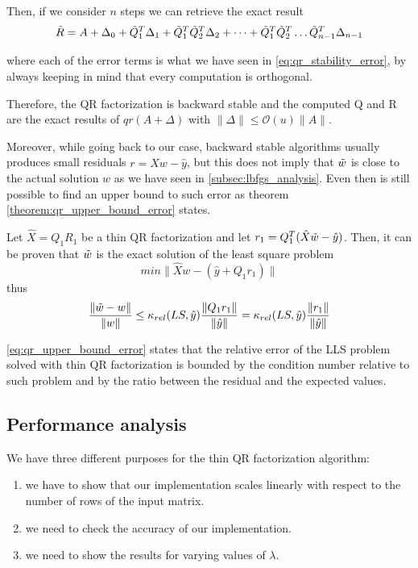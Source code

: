 \noindent Then, if we consider $n$ steps we can retrieve the exact result
\begin{equation}
    \Tilde{R} = A+\Delta_0+\Tilde{Q}_1^T\Delta_1+\Tilde{Q}_1^T\Tilde{Q}_2^T\Delta_2+\dots+\Tilde{Q}_1^T\Tilde{Q}_2^T\dots\Tilde{Q}_{n-1}^T\Delta_{n-1}
    \label{eq:qr_stability_exact_result}
\end{equation}

\noindent where each of the error terms is what we have seen in \eqref{eq:qr_stability_error}, by always keeping in mind that every computation is orthogonal.
\vspace{3mm}

\noindent Therefore, the QR factorization is backward stable and the computed Q and R are the exact results of $qr(A+\Delta)$ with $\lVert \Delta \rVert \leq \mathcal{O}(u) \lVert A \rVert$.
\vspace{3mm}

\noindent Moreover, while going back to our case, backward stable algorithms usually produces small residuals $r=\hat{X}w-\hat{y}$, but this does not imply that $\Tilde{w}$ is close to the actual solution $w$ as we have seen in \ref{subsec:lbfgs_analysis}. Even then is still possible to find an upper bound to such error as theorem \ref{theorem:qr_upper_bound_error} states.
\begin{theorem}
    Let $\hat{X}=Q_1R_1$ be a thin QR factorization and let $r_1=Q_1^T(\hat{X}\Tilde{w}-\hat{y})$. Then, it can be proven that $\Tilde{w}$ is the exact solution of the least square problem
    \begin{equation}
        min \lVert \hat{X}w-(\hat{y}+Q_1r_1) \rVert
        \label{eq:qr_least_square}
    \end{equation}
    thus
    \begin{equation}
        \frac{\lVert \Tilde{w}-w\rVert}{\lVert w\rVert}\leq \kappa_{rel}(LS,\hat{y})\frac{\lVert Q_1r_1\rVert}{\lVert \hat{y} \rVert}=\kappa_{rel}(LS,\hat{y})\frac{\lVert r_1\rVert}{\lVert \hat{y} \rVert}
        \label{eq:qr_upper_bound_error}
    \end{equation}
    \label{theorem:qr_upper_bound_error}
\end{theorem}
\noindent \eqref{eq:qr_upper_bound_error} states that the relative error of the LLS problem solved with thin QR factorization is bounded by the condition number relative to such problem and by the ratio between the residual and the expected values.

\subsection{Performance analysis}
We have three different purposes for the thin QR factorization algorithm:
\begin{enumerate}
    \item we have to show that our implementation scales linearly with respect to the number of rows of the input matrix.
    \item we need to check the accuracy of our implementation.
    \item we need to show the results for varying values of $\lambda$.
\end{enumerate}

